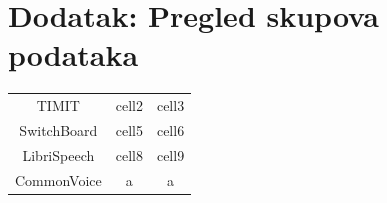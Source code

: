 \documentclass[a4paper]{article}
\newtheorem{primer}{Primer}[section]
\begin{document}







\appendix
 
% 


\appendix

\section{Dodatak: Pregled skupova podataka}
\label{sec:skupovi}

\begin{table}[h!]
\begin{center}
  \begin{tabular}{|c|c|c|}
    \hline
    TIMIT & cell2 & cell3 \\ 
    SwitchBoard & cell5 & cell6 \\ 
    LibriSpeech & cell8 & cell9 \\ 
    CommonVoice & a & a \\
    \hline
  \end{tabular}
\end{center}
\end{table}
\end{document}
